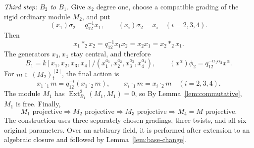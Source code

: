 \documentclass[11pt,a4paper]{article}
\numberwithin{equation}{section}
\theoremstyle{definition}
\theoremstyle{plain}
\theoremstyle{remark}
\DeclareMathOperator{\Ext}{Ext}
\begin{document}
\smallskip\noindent
\emph{Third step: \(B_2\) to \(B_1\).}
Give \(x_2\) degree one, choose a compatible grading of the rigid
ordinary module \(M_2\), and put
\[
 (x_1)\sigma_2=q_{12}^{-1}x_1,\qquad
 (x_i)\sigma_2=x_i\quad(i=2,3,4).
\]
Then
\[
 x_1*_2x_2=q_{12}^{-1}x_1x_2=x_2x_1=x_2*_2x_1.
\]
The generators \(x_3,x_4\) stay central, and therefore
\[
 B_1=k[x_1,x_2,x_3,x_4]/(x_1^{a_1},x_2^{a_2},x_3^{a_3},x_4^{a_4}),
 \qquad (x^\alpha)\phi_2=q_{12}^{-\alpha_1\alpha_2}x^\alpha.
\]
For \(m\in(M_2)_t^{[2]}\), the final action is
\[
 x_1\cdot_1m=q_{12}^{-t}(x_1\cdot_2m),\qquad
 x_i\cdot_1m=x_i\cdot_2m\quad(i=2,3,4).
\]
The module \(M_1\) has \(\Ext_{B_1}^2(M_1,M_1)=0\), so
By Lemma~\ref{lem:commutative}, \(M_1\) is free. Finally,
\[
 M_1\text{ projective}\Longrightarrow M_2\text{ projective}
 \Longrightarrow M_3\text{ projective}\Longrightarrow M_4=M\text{ projective}.
\]
The construction uses three separately chosen gradings, three twists,
and all six original parameters. Over an arbitrary field, it is
performed after extension to an algebraic closure and followed by
Lemma~\ref{lem:base-change}.
\end{document}
